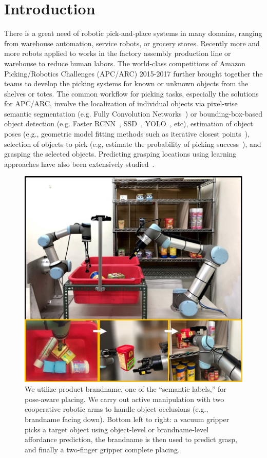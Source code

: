 \chapter{Introduction}
\label{chapter:intro}

There is a great need of robotic pick-and-place systems in many domains, ranging from warehouse automation, service robots, or grocery stores.
Recently more and more robots applied to works in the factory assembly production line or warehouse to reduce human labors. The world-class competitions of Amazon Picking/Robotics Challenges (APC/ARC) 2015-2017 further brought together the teams to develop the picking systems for known or unknown objects from the shelves or totes. The common workflow for picking tasks, especially the solutions for APC/ARC, involve the localization of individual objects via pixel-wise semantic segmentation (e.g. Fully Convolution Networks~\cite{long2015fully}) or bounding-box-based object detection (e.g. Faster RCNN~\cite{ren2015faster}, SSD~\cite{liu2016ssd}, YOLO~\cite{redmon2016you}, etc), estimation of object poses (e.g., geometric model fitting methods such as iterative closest points~\cite{pomerleau2013comparing}), selection of objects to pick (e.g, estimate the probability of picking success~\cite{zeng2018robotic}), and grasping the selected objects. Predicting grasping locations using learning approaches have also been extensively studied~\cite{redmon2015real, mahler2016dex1, mahler2017dex, mahler2017dex3}.

\begin{figure}[t]
\includegraphics[width=1.0\columnwidth]{./figures/pose-aware-placing-teaser-v3.jpg}
\centering
\caption{We utilize product brandname, one of the ``semantic labels,'' for pose-aware placing. We carry out active manipulation with two cooperative robotic arms to handle object occlusions (e.g., brandname facing down). Bottom left to right: a vacuum gripper picks a target object using object-level or brandname-level affordance prediction, the brandname is then used to predict grasp, and finally a two-finger gripper complete placing.}
\end{figure}

